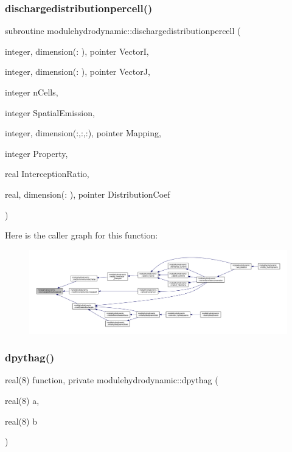 \subsubsection{\texorpdfstring{dischargedistributionpercell()}{dischargedistributionpercell()}}
{\footnotesize\ttfamily subroutine modulehydrodynamic\+::dischargedistributionpercell (\begin{DoxyParamCaption}\item[{integer, dimension(\+:    ), pointer}]{VectorI,  }\item[{integer, dimension(\+:    ), pointer}]{VectorJ,  }\item[{integer}]{n\+Cells,  }\item[{integer}]{Spatial\+Emission,  }\item[{integer, dimension(\+:,\+:,\+:), pointer}]{Mapping,  }\item[{integer}]{Property,  }\item[{real}]{Interception\+Ratio,  }\item[{real, dimension(\+:    ), pointer}]{Distribution\+Coef }\end{DoxyParamCaption})\hspace{0.3cm}{\ttfamily [private]}}

Here is the caller graph for this function\+:\nopagebreak
\begin{figure}[H]
\begin{center}
\leavevmode
\includegraphics[width=350pt]{namespacemodulehydrodynamic_af887912ae7453edc3375d52c4f6cdfc3_icgraph}
\end{center}
\end{figure}
\mbox{\label{namespacemodulehydrodynamic_a0f02ba5b0cd9a0eb64c1d50570398e36}} 
\subsubsection{\texorpdfstring{dpythag()}{dpythag()}}
{\footnotesize\ttfamily real(8) function, private modulehydrodynamic\+::dpythag (\begin{DoxyParamCaption}\item[{real(8)}]{a,  }\item[{real(8)}]{b }\end{DoxyParamCaption})\hspace{0.3cm}{\ttfamily [private]}}

